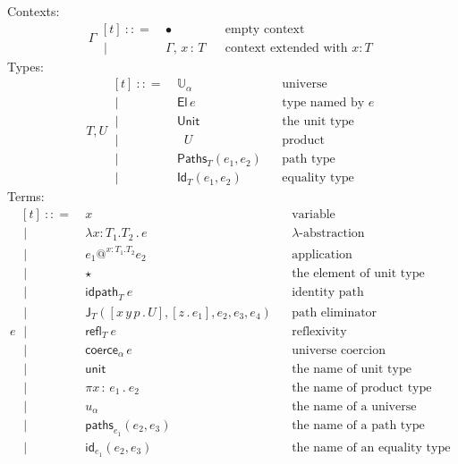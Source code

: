 \documentclass{article}
\makeatletter
\newcommand{\G}{\Gamma} %
\newcommand{\T}{T} %
\newcommand{\U}{U} %
\newcommand{\x}{x} %
\newcommand{\e}{e} %
\newcommand{\bnf}{\ \mathrel{{:}{:}{=}}\ }
\newcommand{\bnfor}{\ \mid\ \ }
\newcommand{\ctxempty}{\bullet} %
\newcommand{\ctxextend}[3]{#1,\, #2\, {:}\, #3} %
\newcommand{\Universe}[1]{\mathbb{U}_{#1}} %
\newcommand{\El}[1]{\mathsf{El}\, #1} %
\newcommand{\Unit}{\mathsf{Unit}} %
\newcommand{\Prod}[2]{\mathop{\textstyle\prod_{(#1 {:} #2)}}} %
\newcommand{\lam}[3]{\lambda #1 {:} #2.{#3}\,.\,} %
\newcommand{\app}[5]{#1\mathbin{@^{#2{:}#3.#4}} #5} %
\newcommand{\abst}[2]{[#1 \,.\, #2]} %
\newcommand{\unitTerm}{\star} %
\newcommand{\coerce}[2]{\mathsf{coerce}_{#1} \, #2}
\newcommand{\PrEqual}[3]{\mathsf{Paths}_{#1}(#2,#3)} %
\newcommand{\JuEqual}[3]{\mathsf{Id}_{#1}(#2,#3)} %
\newcommand{\PrElim}[6]{\mathsf{J}_{#1}(#2, #3, #4, #5, #6)} %
\newcommand{\prRefl}[1]{{\mathsf{idpath}_{#1}}\ }  %
\newcommand{\juRefl}[1]{{\mathsf{refl}_{#1}}\ }    %
\newcommand{\nUnit}{\mathsf{unit}} %
\newcommand{\nProd}[2]{\pi #1\,{:}\,#2 \,.\ } %
\newcommand{\nUniverse}[1]{u_{#1}}  %
\newcommand{\nPrEqual}[3]{\mathsf{paths}_{#1}(#2,#3)} %
\newcommand{\nJuEqual}[3]{\mathsf{id}_{#1}(#2,#3)} %
\makeatother
\begin{document}
Contexts:
%
\begin{equation*}
  \G
  \begin{aligned}[t]
    \bnf   {}& \ctxempty & & \text{empty context}\\
    \bnfor {}& \ctxextend{\G}{\x}{\T} & & \text{context extended with $x : T$}
  \end{aligned}
\end{equation*}
%
Types:
%
\begin{equation*}
  \T, \U
  \begin{aligned}[t]
    \bnf   {}& \Universe{\alpha} & & \text{universe}\\
    \bnfor {}& \El{\e} & & \text{type named by $e$}\\
    \bnfor {}& \Unit & & \text{the unit type}\\
    \bnfor {}& \Prod{x}{\T} \U & & \text{product}\\
    \bnfor {}& \PrEqual{T}{\e_1}{\e_2} & & \text{path type}\\
    \bnfor {}& \JuEqual{T}{\e_1}{\e_2} & & \text{equality type}
  \end{aligned}
\end{equation*}
%
Terms:
%
\begin{equation*}
  \e
  \begin{aligned}[t]
    \bnf   {}&  \x   &&\text{variable} \\
    \bnfor {}&  \lam{\x}{\T_1}{\T_2} \e  &&\text{$\lambda$-abstraction} \\
    \bnfor {}&  \app{\e_1}{\x}{\T_1}{\T_2}{\e_2}  &&\text{application} \\
    \bnfor {}&  \unitTerm  &&\text{the element of unit type} \\
    \bnfor {}&  \prRefl{\T}{\e}  &&\text{identity path} \\
    \bnfor {}&  \PrElim{\T}{\abst{x\,y\,p}{\U}}{\abst{z}{\e_1}}{\e_2}{\e_3}{\e_4}  &&\text{path eliminator} \\
    \bnfor {}&  \juRefl{\T} \e  &&\text{reflexivity} \\
    \bnfor {}&  \coerce{\alpha}{\e}  &&\text{universe coercion} \\
    \bnfor {}&  \nUnit  &&\text{the name of unit type} \\
    \bnfor {}&  \nProd{\x}{\e_1} \e_2  &&\text{the name of product type} \\
    \bnfor {}&  \nUniverse{\alpha} &&\text{the name of a universe} \\
    \bnfor {}&  \nPrEqual{\e_1}{\e_2}{\e_3}  &&\text{the name of a path type} \\
    \bnfor {}&  \nJuEqual{\e_1}{\e_2}{\e_3}  &&\text{the name of an equality type}
  \end{aligned}
\end{equation*}
\end{document}

